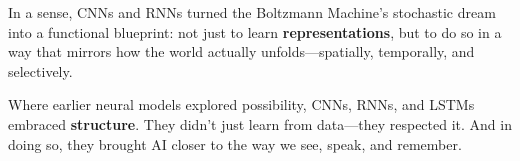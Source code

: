 In a sense, CNNs and RNNs turned the Boltzmann Machine’s stochastic dream into a functional blueprint: not just to learn \textbf{representations}, but to do so in a way that mirrors how the world actually unfolds—spatially, temporally, and selectively.

\begin{tcolorbox}[colback=blue!5!white, colframe=blue!50!black, title={Architectures With Intuition}]
Where earlier neural models explored possibility,  
CNNs, RNNs, and LSTMs embraced \textbf{structure}.  
They didn’t just learn from data—they respected it.  
And in doing so, they brought AI closer to the way we see, speak, and remember.
\end{tcolorbox}
